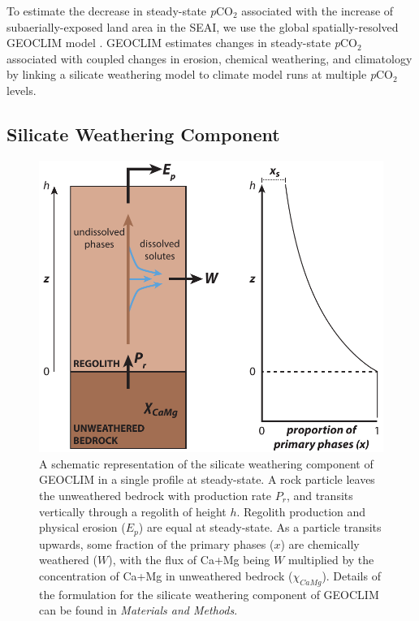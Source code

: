 \documentclass[9pt,twocolumn,twoside,lineno]{pnas-new}
\newcommand{\pCOtwo}{\textit{p}CO$_{2}$\xspace}
\newcommand{\MM}{\textit{Materials and Methods}\xspace}
\begin{document}
To estimate the decrease in steady-state \pCOtwo associated with the increase of subaerially-exposed land area in the SEAI, we use the global spatially-resolved GEOCLIM model \cite{Godderis2017c}. GEOCLIM estimates changes in steady-state \pCOtwo associated with coupled changes in erosion, chemical weathering, and climatology by linking a silicate weathering model to climate model runs at multiple \pCOtwo levels.

\subsection*{Silicate Weathering Component}

\begin{figure}[h]
    \centering
    \includegraphics[width=1\linewidth]{Figures/regolith_schematic.pdf}
    \caption{A schematic representation of the silicate weathering component of GEOCLIM in a single profile at steady-state. A rock particle leaves the unweathered bedrock with production rate $P_{r}$, and transits vertically through a regolith of height $h$. Regolith production and physical erosion ($E_{p}$) are equal at steady-state. As a particle transits upwards, some fraction of the primary phases ($x$) are chemically weathered ($W$), with the flux of Ca+Mg being $W$ multiplied by the concentration of Ca+Mg in unweathered bedrock ($\chi_{CaMg}$). Details of the formulation for the silicate weathering component of GEOCLIM can be found in \MM.}
    \label{fig:regolith_schematic}
\end{figure}
\end{document}
